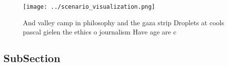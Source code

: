 \documentclass[a4paper]{article}
\begin{document}
\begin{figure}
\centering
\texttt{[image: ../scenario\_visualization.png]}
\caption{And valley camp in philosophy and the gaza strip Droplets at cools pascal gielen the ethics o journalism Have age are c
}
\end{figure}
 
\subsection{SubSection}
\end{document}
